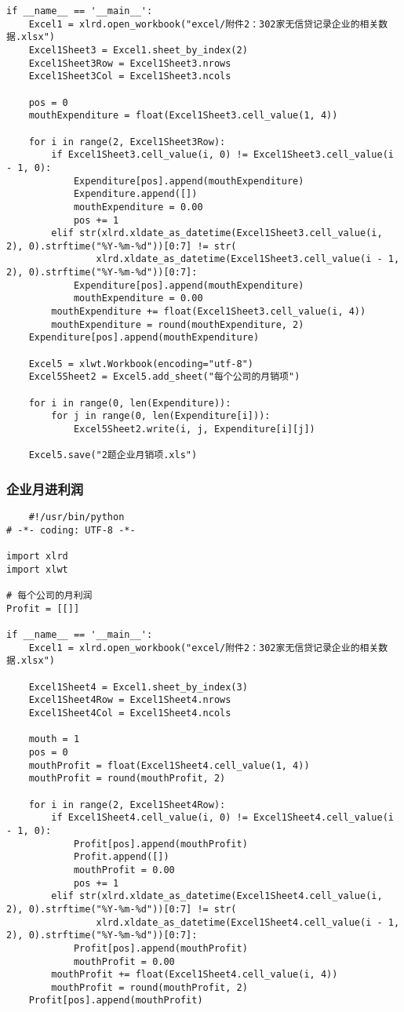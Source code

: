 \documentclass[dvipsnames,withoutpreface,bwprint]{cumcmthesis}
\begin{document}
\begin{appendices}
\begin{lstlisting}
if __name__ == '__main__':
    Excel1 = xlrd.open_workbook("excel/附件2：302家无信贷记录企业的相关数据.xlsx")
    Excel1Sheet3 = Excel1.sheet_by_index(2)
    Excel1Sheet3Row = Excel1Sheet3.nrows
    Excel1Sheet3Col = Excel1Sheet3.ncols

    pos = 0
    mouthExpenditure = float(Excel1Sheet3.cell_value(1, 4))

    for i in range(2, Excel1Sheet3Row):
        if Excel1Sheet3.cell_value(i, 0) != Excel1Sheet3.cell_value(i - 1, 0):
            Expenditure[pos].append(mouthExpenditure)
            Expenditure.append([])
            mouthExpenditure = 0.00
            pos += 1
        elif str(xlrd.xldate_as_datetime(Excel1Sheet3.cell_value(i, 2), 0).strftime("%Y-%m-%d"))[0:7] != str(
                xlrd.xldate_as_datetime(Excel1Sheet3.cell_value(i - 1, 2), 0).strftime("%Y-%m-%d"))[0:7]:
            Expenditure[pos].append(mouthExpenditure)
            mouthExpenditure = 0.00
        mouthExpenditure += float(Excel1Sheet3.cell_value(i, 4))
        mouthExpenditure = round(mouthExpenditure, 2)
    Expenditure[pos].append(mouthExpenditure)

    Excel5 = xlwt.Workbook(encoding="utf-8")
    Excel5Sheet2 = Excel5.add_sheet("每个公司的月销项")

    for i in range(0, len(Expenditure)):
        for j in range(0, len(Expenditure[i])):
            Excel5Sheet2.write(i, j, Expenditure[i][j])

    Excel5.save("2题企业月销项.xls")
\end{lstlisting}
\subsubsection{企业月进利润}
\begin{lstlisting}
    #!/usr/bin/python
# -*- coding: UTF-8 -*-

import xlrd
import xlwt

# 每个公司的月利润
Profit = [[]]

if __name__ == '__main__':
    Excel1 = xlrd.open_workbook("excel/附件2：302家无信贷记录企业的相关数据.xlsx")

    Excel1Sheet4 = Excel1.sheet_by_index(3)
    Excel1Sheet4Row = Excel1Sheet4.nrows
    Excel1Sheet4Col = Excel1Sheet4.ncols

    mouth = 1
    pos = 0
    mouthProfit = float(Excel1Sheet4.cell_value(1, 4))
    mouthProfit = round(mouthProfit, 2)

    for i in range(2, Excel1Sheet4Row):
        if Excel1Sheet4.cell_value(i, 0) != Excel1Sheet4.cell_value(i - 1, 0):
            Profit[pos].append(mouthProfit)
            Profit.append([])
            mouthProfit = 0.00
            pos += 1
        elif str(xlrd.xldate_as_datetime(Excel1Sheet4.cell_value(i, 2), 0).strftime("%Y-%m-%d"))[0:7] != str(
                xlrd.xldate_as_datetime(Excel1Sheet4.cell_value(i - 1, 2), 0).strftime("%Y-%m-%d"))[0:7]:
            Profit[pos].append(mouthProfit)
            mouthProfit = 0.00
        mouthProfit += float(Excel1Sheet4.cell_value(i, 4))
        mouthProfit = round(mouthProfit, 2)
    Profit[pos].append(mouthProfit)


\end{lstlisting}
\end{appendices}
\end{document}
